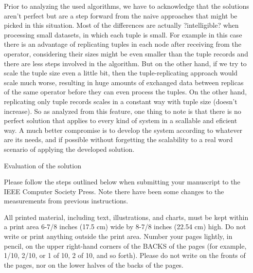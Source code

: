 \documentclass[times, 10pt,twocolumn]{article}
\begin{document}
Prior to analyzing the used algorithms, we have to acknowledge that the
solutions aren't perfect but are a step forward from the naive approaches
that might be picked in this situation. Most of the differences are
actually ?intelligible? when processing small datasets, in which each
tuple is small.  For example in this case there is an advantage of
replicating tuples in each node after receiving from the operator,
considering their sizes might be even smaller than the tuple records and
there are less steps involved in the algorithm. But on the other hand, if
we try to scale the tuple size even a little bit, then the
tuple-replicating approach would scale much worse, resulting in huge
amounts of exchanged data between replicas of the same operator before
they can even process the tuples. On the other hand, replicating only
tuple records scales in a constant way with tuple size (doesn't increase).
So as analyzed from this feature, one thing to note is that there is no
perfect solution that applies to every kind of system in a scallable and
eficient way.  A much better compromise is to develop the system according
to whatever are its needs, and if possible without forgetting the
scalability to a real word scenario of applying the developed solution.


Evaluation of the solution


Please follow the steps outlined below when submitting your manuscript to
the IEEE Computer Society Press. Note there have been some changes to the
measurements from previous instructions. 


All printed material, including text, illustrations, and charts, must be
kept within a print area 6-7/8 inches (17.5 cm) wide by 8-7/8 inches
(22.54 cm) high.  Do not write or print anything outside the print area.
Number your pages lightly, in pencil, on the upper right-hand corners of
the BACKS of the pages (for example, 1/10, 2/10, or 1 of 10, 2 of 10, and
so forth). Please do not write on the fronts of the pages, nor on the
lower halves of the backs of the pages.


\end{document}

